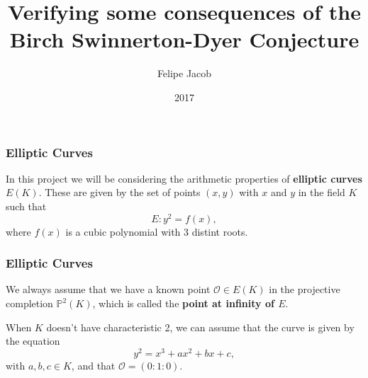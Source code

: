 \message{ !name(presentation.tex)}\documentclass{beamer}
\title[BSD]{Verifying some consequences of the Birch Swinnerton-Dyer Conjecture}
\author{Felipe Jacob}
\institute[UCL]{University College London}
\date{2017}
\begin{document}


\newcommand{\defin}{\textbf}
\newcommand{\CC}{{\mathbb C}}
\newcommand{\cov}{{\operatorname{cov}}}
\newcommand{\eE}{{\mathcal E}}
\newcommand{\NN}{{\mathbb N}}
\newcommand{\PP}{{\mathbb P}}
\newcommand{\ZZ}{{\mathbb Z}}
\renewcommand{\SS}{{\mathbb S}}
\newcommand{\DD}{{\mathbb D}}
\newcommand{\RR}{{\mathbb R}}
\newcommand{\QQ}{{\mathbb Q}}
\newcommand{\rR}{{\mathcal R}}
\newcommand{\OO}{{\mathcal O}}
\newcommand{\p}{\partial}
\newcommand{\mM}{{\mathcal M}}
\newcommand{\pP}{{\mathcal P}}
\newcommand{\iI}{{\mathcal I}}
\newcommand{\jJ}{{\mathcal J}}
\newcommand{\uU}{{\mathcal U}}
\newcommand{\sS}{{\mathfrak S}}
\newcommand{\1}{{\mathds 1}}
\newcommand{\Crit}{\operatorname{Crit}}
\newcommand{\GKK}{{G_{\bar{K} : K}}}
\newcommand{\st}{{\text{s.t.}}}
\newcommand{\ra}{\rightarrow}
\newcommand{\Sel}{\text{\normalfont Sel}}
\newcommand{\Sha}{\text{\normalfont Sha}}
\newcommand{\TS}{\text{\normalfont TS}}
\newcommand{\Eb}{\bar{E}}
\newcommand{\EQ}{E(\QQ)}
\newcommand{\cmark}{\textrm{\ding{51}}}
\newcommand{\xmark}{\textrm{\ding{55}}}
\newcommand{\EFp}{{\tilde{E}(\FF_p)}}
\newcommand{\EFt}{{\tilde{E}(\FF_2)}}
\newcommand{\EQp}{{E(\QQ_p)}}
\newcommand{\FF}{\mathbb{F}}
\newcommand{\HH}{\mathbb{H}}
\newcommand{\Tors}{{\text{\normalfont Tors}}}
\newcommand{\parder}[2]{\frac{\partial #1}{\partial #2}}
\newcommand{\Zpx}{\mathbb{Z}_p^\times}
\newcommand{\legendre}[2]{\left(\frac{#1}{#2}\right)}
\newcommand{\quadring}[1]{\ZZ[\sqrt{#1}]}
\newcommand{\Ip}{\mathfrak{p}}
\newcommand{\Aa}{\mathbb{A}}
\newcommand{\LL}{\mathcal{L}}
\newcommand{\Shim}{\textnormal{Shim}}

\frame{\titlepage}
 
\begin{frame}
\frametitle{Elliptic Curves}
In this project we will be considering the arithmetic properties of
\textbf{elliptic curves} $E(K)$. These are given by the set of points $(x, y)$
with $x$ and $y$ in
the field $K$ such that
\[E: y^2 = f(x),\]
where $f(x)$ is a cubic polynomial with 3 distint roots.
\end{frame}

\begin{frame}
\frametitle{Elliptic Curves}
  We always assume that we have a known point $\OO \in E(K)$ in the projective
  completion $\PP^2(K)$, which is called the \textbf{point at infinity of $E$}. \pause

  When $K$ doesn't have characteristic 2, we can assume that the curve is given
  by the equation
  \[y^2 = x^3 + ax^2 + bx + c,\]
  with $a, b, c \in K$, and that $\OO = (0:1:0).$
\end{frame}
\end{document}
